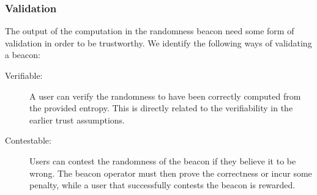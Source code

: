 \subsubsection{Validation}
The output of the computation in the randomness beacon need some form of validation in order to be trustworthy.
We identify the following ways of validating a beacon:

\begin{description}
    \item[Verifiable:]
        A user can verify the randomness to have been correctly computed from the provided entropy.
        This is directly related to the verifiability in the earlier trust assumptions.

    \item[Contestable:]
        Users can contest the randomness of the beacon if they believe it to be wrong.
        The beacon operator must then prove the correctness or incur some penalty, while a user that successfully contests the beacon is rewarded. 
\end{description}

